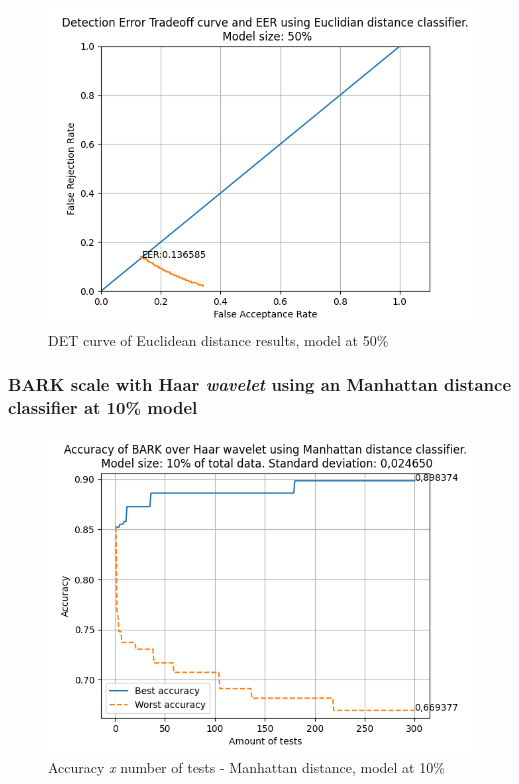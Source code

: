 			\begin{figure}[H]
				\centering
				\includegraphics[scale=.6]{images/results/det/DET_for_classifier_Euclidian_50}
				\caption{DET curve of Euclidean distance results, model at 50\%}
				\label{fig:detforclassifiereuclidian50}
			\end{figure}
		
			
		
		\subsubsection{BARK scale with Haar \textit{wavelet} using an Manhattan distance classifier at 10\% model}
			
			\begin{figure}[H]
				\centering
				\includegraphics[scale=.6]{images/results/confusionMatrices/classifier_Manhattan_10.png}
				\caption{Accuracy \textit{x} number of tests - Manhattan distance, model at 10\%}
				\label{fig:classifiermanhattan10}
			\end{figure}
			
